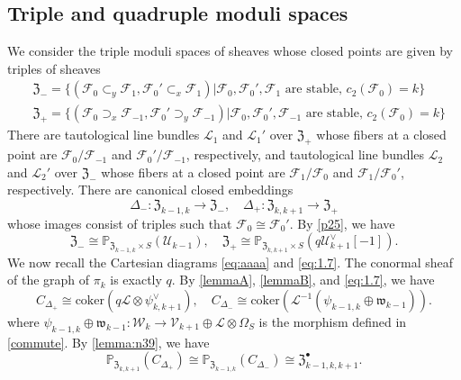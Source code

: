 \documentclass{amsart}
\numberwithin{equation}{section}
\newcommand\mc{\mathcal}
\newcommand\mf{\mathfrak}
\newcommand\mb{\mathbb}
\theoremstyle{definition}
\theoremstyle{remark}
\begin{document}
\subsection{Triple and quadruple moduli spaces} \label{s13}
We consider the triple moduli spaces of sheaves whose closed points are given by triples of sheaves
  \begin{align*}
   &  \mf{Z}_{-}=\{(\mc{F}_{0}\subset_{y} \mc{F}_{1}, \mc{F}_{0}'\subset_{x} \mc{F}_{1})|\mc{F}_{0},\mc{F}_{0}',\mc{F}_{1} \text{ are stable, } c_{2}(\mc{F}_{0})=k\} \\
 &  \mf{Z}_{+}=\{(\mc{F}_{0}\supset_{x} \mc{F}_{-1}, \mc{F}_{0}'\supset_{y} \mc{F}_{-1})|\mc{F}_{0},\mc{F}_{0}',\mc{F}_{-1} \text{ are stable, } c_{2}(\mc{F}_{0})=k\}
\end{align*}
There are tautological line bundles $\mathcal{L}_{1}$ and $\mathcal{L}_1'$ over $\mf{Z}_+$ whose fibers at a closed point are $\mc{F}_0/\mc{F}_{-1}$ and $\mc{F}_0'/\mc{F}_{-1}$, respectively, and tautological line bundles $\mc{L}_2$ and $\mc{L}_2'$ over $\mf{Z}_-$ whose fibers at a closed point are $\mc{F}_{1}/\mc{F}_0$ and $\mc{F}_1/\mc{F}_0'$, respectively. There are canonical closed embeddings 
$$\Delta_{-}:\mf{Z}_{k-1,k}\to \mf{Z}_{-}, \quad \Delta_{+}:\mf{Z}_{k,k+1}\to \mf{Z}_{+}$$
whose images consist of triples such that $\mc{F}_{0}\cong \mc{F}_{0}'$. By \cref{p25}, we have 
\begin{equation}
  \label{eq:1.6}
  \mf{Z}_{-}\cong \mb{P}_{\mf{Z}_{k-1,k}\times S}(\mc{U}_{k-1}),\quad \mf{Z}_{+}\cong \mb{P}_{\mf{Z}_{k,k+1}\times S}(q\mc{U}_{k+1}^{\vee}[-1]).
\end{equation}
We now recall the Cartesian diagrams \cref{eq:aaaa} and \cref{eq:1.7}. The conormal sheaf of the graph of $\pi_k$ is exactly $q$. By \cref{lemmaA}, \cref{lemmaB}, and \cref{eq:1.7}, we have 
\begin{equation*}
  C_{\Delta_{+}}\cong \mathrm{coker}(q\mc{L}\otimes \psi_{k,k+1}^{\vee}),\quad C_{\Delta_{-}}\cong \mathrm{coker}(\mc{L}^{-1}(\psi_{k-1,k}\oplus \mf{w}_{k-1})).
\end{equation*}
where $\psi_{k-1,k}\oplus \mf{w}_{k-1}:\mc{W}_k\to \mc{V}_{k+1}\oplus \mc{L}\otimes \Omega_S$ is the morphism defined in \cref{commute}. By \cref{lemma:n39}, we have 
\begin{equation}
  \label{eq:1.8}
  \mb{P}_{\mf{Z}_{k,k+1}}(C_{\Delta_{+}})\cong \mb{P}_{\mf{Z}_{k-1,k}}(C_{\Delta_{-}})\cong \mf{Z}_{k-1,k,k+1}^{\bullet}.
\end{equation}
\end{document}

